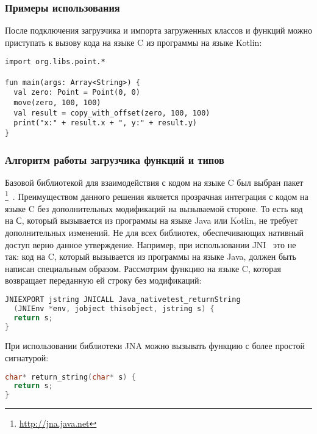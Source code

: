 \begin{code}
\subsubsection{Примеры использования}
После подключения загрузчика и импорта загруженных классов и функций можно приступать к вызову кода на языке C из программы на языке Kotlin:
\begin{lstlisting}[caption={Пример работы с функциями и структурами данных, загруженных из заголовочного файла~\ref{point-h-example}.}, label=point-example]
import org.libs.point.*

fun main(args: Array<String>) {
  val zero: Point = Point(0, 0)
  move(zero, 100, 100)
  val result = copy_with_offset(zero, 100, 100)
  print("x:" + result.x + ", y:" + result.y)
}
\end{lstlisting}\end{code}
\subsubsection{Алгоритм работы загрузчика функций и типов}

Базовой библиотекой для взаимодействия с кодом на языке C был выбран пакет \footnote{\url{http://jna.java.net}}~\cite{jna-book}.
Преимуществом данного решения является прозрачная интеграция с кодом на языке C без дополнительных модификаций на вызываемой стороне.
То есть код на С, который вызывается из программы на языке Java или Kotlin, не требует дополнительных изменений.
Не для всех библиотек, обеспечивающих нативный доступ верно данное утверждение.
Например, при использовании JNI~\cite{jni-spec} это не так: код на C, который вызывается из программы на языке Java, должен быть написан специальным образом.
Рассмотрим функцию на языке C, которая возвращает переданную ей строку без модификаций:

\begin{code}\begin{lstlisting}[language=C, caption={Пример функции на языке C, которая доступна для вызова через библиотеку JNI.}, label=jni-example]
JNIEXPORT jstring JNICALL Java_nativetest_returnString
  (JNIEnv *env, jobject thisobject, jstring s) {
  return s;
}
\end{lstlisting}\end{code}

При использовании библиотеки JNA можно вызывать функцию с более простой сигнатурой:
\begin{code}\begin{lstlisting}[language=C, caption={Пример функции на языке C, аналогичной функции из примера~\ref{jni-example}, которая доступна для вызова через библиотеку JNA.}, label=jna-example]
char* return_string(char* s) {
  return s;
}
\end{lstlisting}\end{code}

